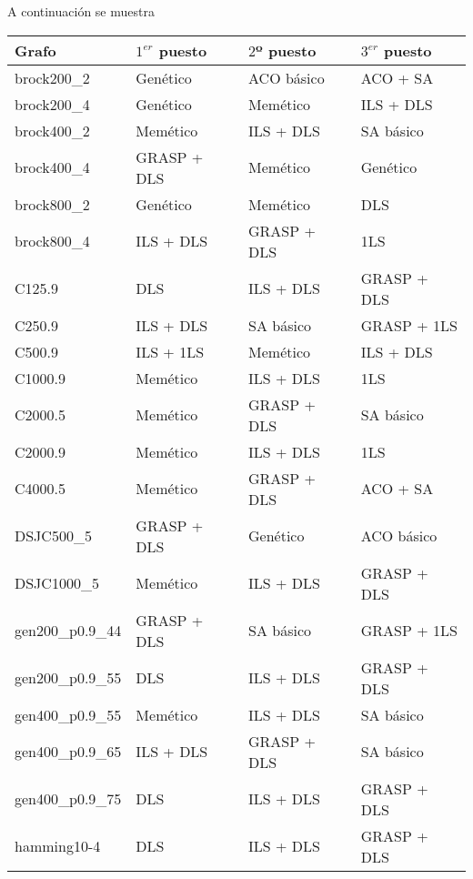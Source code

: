 A continuación se muestra

\begin{small}
\begin{longtable}{l l l l}
  \label{table:posiciones}\\
  \endhead
  \endfoot
    Grafo              & $1^{er}$ puesto & $2$º puesto & $3^{er}$ puesto \\ \hline
    brock200\_2        & Genético & ACO básico & ACO + SA  \\  \hline
    brock200\_4        & Genético & Memético & ILS + DLS  \\  \hline
    brock400\_2        & Memético & ILS + DLS & SA básico  \\  \hline
    brock400\_4        & GRASP + DLS & Memético & Genético  \\  \hline
    brock800\_2        & Genético & Memético & DLS  \\  \hline
    brock800\_4        & ILS + DLS & GRASP + DLS & 1LS  \\  \hline
    C125.9             & DLS & ILS + DLS & GRASP + DLS  \\  \hline
    C250.9             & ILS + DLS & SA básico & GRASP + 1LS  \\  \hline
    C500.9             & ILS + 1LS & Memético & ILS + DLS \\  \hline
    C1000.9            & Memético & ILS + DLS & 1LS  \\  \hline
    C2000.5            & Memético & GRASP + DLS & SA básico  \\  \hline
    C2000.9            & Memético & ILS + DLS & 1LS  \\  \hline
    C4000.5            & Memético & GRASP + DLS & ACO + SA  \\  \hline
    DSJC500\_5         & GRASP + DLS & Genético & ACO básico  \\  \hline
    DSJC1000\_5        & Memético & ILS + DLS & GRASP + DLS  \\  \hline
    gen200\_p0.9\_44   & GRASP + DLS & SA básico & GRASP + 1LS  \\  \hline
    gen200\_p0.9\_55   & DLS & ILS + DLS & GRASP + DLS  \\  \hline
    gen400\_p0.9\_55   & Memético & ILS + DLS & SA básico  \\  \hline
    gen400\_p0.9\_65   & ILS + DLS & GRASP + DLS & SA básico  \\  \hline
    gen400\_p0.9\_75   & DLS & ILS + DLS & GRASP + DLS  \\  \hline
    hamming10-4        & DLS & ILS + DLS & GRASP + DLS  \\  \hline

\end{longtable}
\end{small}
